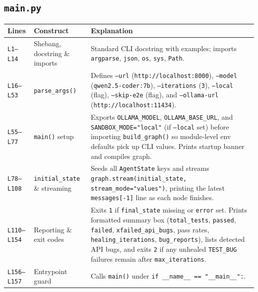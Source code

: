 \documentclass[11pt,a4paper]{article}
\begin{document}
\subsection{\texttt{main.py}}
\begin{longtable}{L{1.4cm} L{5.2cm} L{9.0cm}}
\toprule
\textbf{Lines} & \textbf{Construct} & \textbf{Explanation} \\
\midrule
\endhead
\texttt{L1--L14} & Shebang, docstring \& imports & Standard CLI docstring with examples; imports \texttt{argparse}, \texttt{json}, \texttt{os}, \texttt{sys}, \texttt{Path}. \\
\texttt{L16--L53} & \texttt{parse\_args()} & Defines \texttt{--url} (\texttt{http://localhost:8000}), \texttt{--model} (\texttt{qwen2.5-coder:7b}), \texttt{--iterations} (\texttt{3}), \texttt{--local} (flag), \texttt{--skip-e2e} (flag), and \texttt{--ollama-url} (\texttt{http://localhost:11434}). \\
\texttt{L55--L77} & \texttt{main()} setup & Exports \texttt{OLLAMA\_MODEL}, \texttt{OLLAMA\_BASE\_URL}, and \texttt{SANDBOX\_MODE="local"} (if \texttt{--local} set) before importing \texttt{build\_graph()} so module-level env defaults pick up CLI values. Prints startup banner and compiles graph. \\
\texttt{L78--L108} & \texttt{initial\_state} \& streaming & Seeds all \texttt{AgentState} keys and streams \texttt{graph.stream(initial\_state, stream\_mode="values")}, printing the latest \texttt{messages[-1]} line as each node finishes. \\
\texttt{L110--L154} & Reporting \& exit codes & Exits \texttt{1} if \texttt{final\_state} missing or \texttt{error} set. Prints formatted summary box (\texttt{total\_tests}, \texttt{passed}, \texttt{failed}, \texttt{xfailed\_api\_bugs}, pass rates, \texttt{healing\_iterations}, \texttt{bug\_reports}), lists detected API bugs, and exits \texttt{2} if any unhealed \texttt{TEST\_BUG} failures remain after \texttt{max\_iterations}. \\
\texttt{L156--L157} & Entrypoint guard & Calls \texttt{main()} under \texttt{if \_\_name\_\_ == "\_\_main\_\_":}. \\
\bottomrule
\end{longtable}

\end{document}
